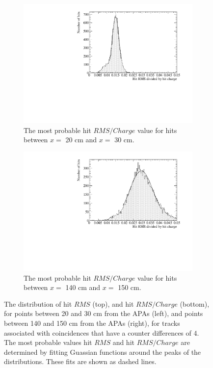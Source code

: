\begin{figure}[h!]
\begin{subfigure}{0.48\textwidth}
    \includegraphics[width=\textwidth]{DataCan_2}
    \caption{The most probable hit $RMS/Charge$ value for hits between $x =$ 20 cm and $x =$ 30 cm.}
  \end{subfigure}%
  \hspace{0.03\textwidth}%
  \begin{subfigure}{0.48\textwidth}
    \centering
    \includegraphics[width=\textwidth]{DataCan_3}
    \caption{The most probable hit $RMS/Charge$ value for hits between $x =$ 140 cm and $x =$ 150 cm.}
  \end{subfigure}
  \caption[The most probable values of the $RMS$ and $RMS/Charge$ distributions for tracks with a counter difference of 4 in the 35 ton data]
          {The distribution of hit $RMS$ (top), and hit $RMS/Charge$ (bottom), for points between 20 and 30 cm from the APAs (left), and points between 140 and 150 cm from the APAs (right), for tracks associated with coincidences that have a counter differences of 4. The most probable values hit $RMS$ and hit $RMS/Charge$ are determined by fitting Guassian functions around the peaks of the distributions. These fits are shown as dashed lines.}
          \label{fig:DiffDataHitFit}
\end{figure}


